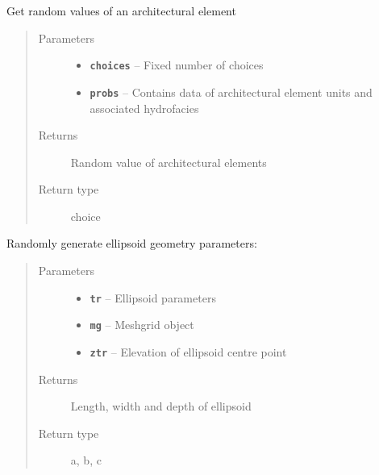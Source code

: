\documentclass[letterpaper,10pt,english]{sphinxmanual}
\begin{document}
\begin{fulllineitems}
\label{hyvr:hyvr.hyvr.sim.prob_choose}
Get random values of an architectural element
\begin{quote}\begin{description}
\item[{Parameters}] \leavevmode\begin{itemize}
\item {} 
\textbf{\texttt{choices}} -- Fixed number of choices

\item {} 
\textbf{\texttt{probs}} -- Contains data of architectural element units and associated hydrofacies

\end{itemize}

\item[{Returns}] \leavevmode
Random value of architectural elements

\item[{Return type}] \leavevmode
choice

\end{description}\end{quote}

\end{fulllineitems}


\begin{fulllineitems}
\label{hyvr:hyvr.hyvr.sim.rand_trough}
Randomly generate ellipsoid geometry parameters:
\begin{quote}\begin{description}
\item[{Parameters}] \leavevmode\begin{itemize}
\item {} 
\textbf{\texttt{tr}} -- Ellipsoid parameters

\item {} 
\textbf{\texttt{mg}} -- Meshgrid object

\item {} 
\textbf{\texttt{ztr}} -- Elevation of ellipsoid centre point

\end{itemize}

\item[{Returns}] \leavevmode
Length, width and depth of ellipsoid

\item[{Return type}] \leavevmode
a, b, c

\end{description}\end{quote}

\end{fulllineitems}
\end{document}
